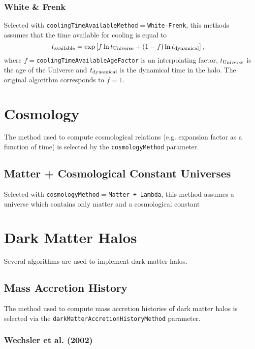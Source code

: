 \subsubsection{White \& Frenk}

Selected with {\tt coolingTimeAvailableMethod}$=${\tt White-Frenk}, this methods assumes that the time available for cooling is equal to
\begin{equation}
 t_{\rm available} = \exp\left[ f \ln t_{\rm Universe} + (1-f)\ln t_{\rm dynamical} \right],
\end{equation}
where $f=${\tt coolingTimeAvailableAgeFactor} is an interpolating factor, $t_{\rm Universe}$ is the age of the Universe and $t_{\rm dynamical}$ is the dynamical time in the halo. The original \cite{white_galaxy_1991} algorithm corresponds to $f=1$.

\section{Cosmology}

The method used to compute cosmological relations (e.g. expansion factor as a function of time) is selected by the {\tt cosmologyMethod} parameter.

\subsection{Matter + Cosmological Constant Universes}

Selected with {\tt cosmologyMethod}$=${\tt Matter + Lambda}, this method assumes a universe which contains only matter and a cosmological constant

\section{Dark Matter Halos}

Several algorithms are used to implement dark matter halos.

\subsection{Mass Accretion History}

The method used to compute mass accretion histories of dark matter halos is selected via the {\tt darkMatterAccretionHistoryMethod} parameter.

\subsubsection{Wechsler et al. (2002)}

